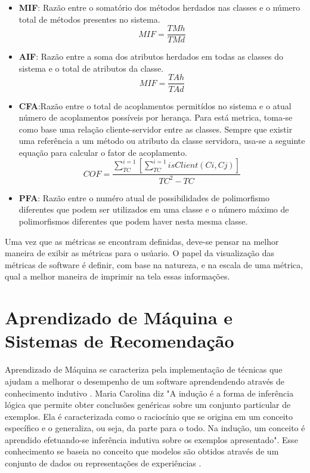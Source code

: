 \begin{itemize}
\item \textbf{MIF}: Razão entre o somatório dos métodos herdados nas classes e o número total de métodos presentes no sistema.
\begin{equation}
MIF = \frac{TMh}{TMd}
\end{equation}
\item \textbf{AIF}: Razão entre a soma dos atributos herdados em todas as classes do sistema e o total de atributos da classe.
\begin{equation}
MIF = \frac{TAh}{TAd}
\end{equation}
\item \textbf{CFA}:Razão entre o total de acoplamentos permitídos no sistema e o atual número de acoplamentos possíveis por herança. Para está metrica, toma-se como base uma relação cliente-servidor entre as classes. Sempre que existir uma referência a um método ou atributo da classe servidora, usa-se a seguinte equação para calcular o fator de acoplamento.
\begin{equation}
COF = \frac{\sum_{TC}^{i=1}[\sum_{TC}^{i=1}isClient(Ci,Cj)]}{TC^2-TC}
\end{equation}
\item \textbf{PFA}: Razão entre o numéro atual de possibilidades de polimorfismo diferentes que podem ser utilizados em uma classe e o número máximo de polimorfismos diferentes que podem haver nesta mesma classe.
\end{itemize}

Uma vez que as métricas se encontram definidas, deve-se pensar na melhor maneira de exibir as métricas para o usúario. O papel da visualização das métricas de software é definir, com base na natureza, e na escala de uma métrica, qual a melhor maneira de imprimir na tela essas informações.

\section{Aprendizado de Máquina e Sistemas de Recomendação}
Aprendizado de Máquina se caracteriza pela implementação de técnicas que ajudam a melhorar o desempenho de um software aprendendendo através de conhecimento indutivo \cite{mitchell1997mcgraw}. Maria Carolina \cite{monard2003conceitos} diz "A indução é a forma de inferência lógica que permite obter conclusões genéricas sobre um conjunto particular de exemplos. Ela é caracterizada como o raciocínio que se origina em um conceito específico e o generaliza, ou seja, da parte para o todo. Na indução, um conceito é aprendido efetuando-se inferência indutiva sobre os exemplos apresentado". Esse conhecimento se baseia no conceito que modelos são obtidos através de um conjunto de dados ou representações de experiências \cite{peres2012tutorial}.

